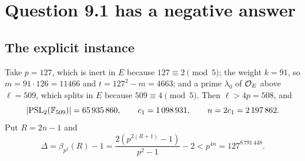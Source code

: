 \section{Question 9.1 has a negative answer}\label{sec:theoremA}

\subsection{The explicit instance}\label{sec:theoremA-explicit}

Take $p=127$, which is inert in $E$ because $127\equiv2\pmod5$; the weight $k=91$, so $m=91\cdot126=11466$ and $t=127^2-m=4663$;
and a prime $\lambda_0$ of $\mathcal{O}_E$ above $\ell=509$, which splits in $E$ because $509\equiv4\pmod5$. Then $\ell>4p=508$, and
\[
  \lvert \operatorname{PSL}_2(\mathbb{F}_{509}) \rvert=65\,935\,860,\qquad c_1=1\,098\,931,\qquad n=2c_1=2\,197\,862.
\]
Put $R=2n-1$ and
\[
  \Delta=\beta_{p^2}(R)-1=\frac{2(p^{2(R+1)}-1)}{p^2-1}-2<p^{4n}=127^{8\,791\,448}.
\]

